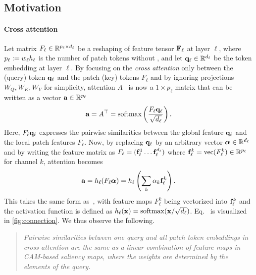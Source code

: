 \subsection{Motivation}
\label{subsec:motiv}

\paragraph{Cross attention}

Let matrix $F_\ell \in \mathbb{R}^{p_\ell \times d_\ell}$ be a reshaping of feature tensor $\mathbf{F}_\ell$ at layer $\ell$, where $p_\ell \mathrel{:=} w_\ell h_\ell$ is the number of patch tokens without \cls, and let $\mathbf{q}_\ell \in \mathbb{R}^{d_\ell}$ be the \cls token embedding at layer $\ell$. By focusing on the \emph{cross attention} only between the \cls (query) token $\mathbf{q}_\ell$ and the patch (key) tokens $F_\ell$ and by ignoring projections $W_Q, W_K, W_V$ for simplicity, attention $A$~ is now a $1 \times p_\ell$ matrix that can be written as a vector $\mathbf{a} \in \mathbb{R}^{p_\ell}$
\begin{equation}
	\mathbf{a} = A^\top = \operatorname{softmax} \left( \frac{F_\ell \mathbf{q}_\ell}{\sqrt{d_\ell}} \right).
\label{eq:cross-attention}
\end{equation}
Here, $F_\ell \mathbf{q}_\ell$ expresses the pairwise similarities between the global \cls feature $\mathbf{q}_\ell$ and the local patch features $F_\ell$. Now, by replacing $\mathbf{q}_\ell$ by an arbitrary vector ${\boldsymbol{\alpha}} \in \mathbb{R}^{d_\ell}$ and by writing the feature matrix as $F_\ell = (\mathbf{f}_\ell^1 \dots \mathbf{f}_\ell^{d_\ell})$ where $\mathbf{f}_\ell^k = \operatorname{vec}(F_\ell^k) \in \mathbb{R}^{p_\ell}$ for channel $k$, attention  becomes
\begin{equation}
	\mathbf{a} = h_\ell (F_\ell {\boldsymbol{\alpha}}) =
		h_\ell \left( \sum_k \alpha_k \mathbf{f}_\ell^k \right).
\label{eq:connection}
\end{equation}
This takes the same form as~, with feature maps $F_\ell^k$ being vectorized into $\mathbf{f}_\ell^k$ and the activation function is defined as $h_\ell(\mathbf{x}) = \operatorname{softmax}(\mathbf{x} / \sqrt{d_\ell})$. Eq.~ is visualized in \autoref{fig:connection}. We thus observe the following.

\begin{quote}
	\emph{Pairwise similarities between one query and all patch token embeddings in cross attention are the same as a linear combination of feature maps in CAM-based saliency maps, where the weights are determined by the elements of the query.}
\end{quote}

